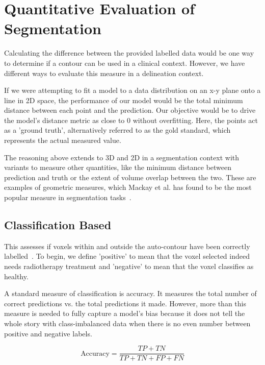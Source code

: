 \documentclass[11pt,twoside]{report}
\begin{document}
\chapter{Quantitative Evaluation of Segmentation}\label{sect:performance-evaluation}

Calculating the difference between the provided labelled data would be one way to determine if a contour can be used in a clinical context. However, we have different ways to evaluate this measure in a delineation context.

If we were attempting to fit a model to a data distribution on an x-y plane onto a line in 2D space, the performance of our model would be the total minimum distance between each point and the prediction. Our objective would be to drive the model's distance metric as close to 0 without overfitting. Here, the points act as a 'ground truth', alternatively referred to as the gold standard, which represents the actual measured value.

The reasoning above extends to 3D and 2D in a segmentation context with variants to measure other quantities, like the minimum distance between prediction and truth or the extent of volume overlap between the two. These are examples of geometric measures, which Mackay et al. has found to be the most popular measure in segmentation tasks~\cite{review-metrics}.

\section{Classification Based}\label{sect:classification-based}

This assesses if voxels within and outside the auto-contour have been correctly labelled~\cite{review-metrics}. To begin, we define 'positive' to mean that the voxel selected indeed needs radiotherapy treatment and 'negative' to mean that the voxel classifies as healthy.

A standard measure of classification is accuracy. It measures the total number of correct predictions vs. the total predictions it made. However, more than this measure is needed to fully capture a model's bias because it does not tell the whole story with class-imbalanced data when there is no even number between positive and negative labels.

\begin{equation*}
 \text{Accuracy} = \frac{TP + TN}{TP + TN + FP + FN}
\end{equation*}
\end{document}
